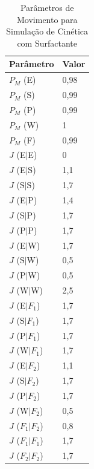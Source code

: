 \documentclass[12pt,oneside]{report}
\begin{document}
\begin{table}[H]
    \centering
    \caption{Parâmetros de Movimento para Simulação de Cinética com Surfactante}
    \vspace{0.2cm}
    \begin{tabularx}{\textwidth}{X m{5cm}}
        \hline
        \textbf{Parâmetro} & \textbf{Valor} \\
        \hline
        $P_M$ (E)                & 0{,}98        \\
        $P_M$ (S)                & 0{,}99        \\
        $P_M$ (P)                & 0{,}99        \\
        $P_M$ (W)                & 1             \\
        $P_M$ (F)                & 0{,}99        \\
        $J$ (E$|$E)              & 0             \\
        $J$ (E$|$S)              & 1{,}1         \\
        $J$ (S$|$S)              & 1{,}7         \\
        $J$ (E$|$P)              & 1{,}4         \\
        $J$ (S$|$P)              & 1{,}7         \\
        $J$ (P$|$P)              & 1{,}7         \\
        $J$ (E$|$W)              & 1{,}7         \\
        $J$ (S$|$W)              & 0{,}5         \\
        $J$ (P$|$W)              & 0{,}5         \\
        $J$ (W$|$W)              & 2{,}5         \\
        $J$ (E$|F_1$)            & 1{,}7         \\
        $J$ (S$|F_1$)            & 1{,}7         \\
        $J$ (P$|F_1$)            & 1{,}7         \\
        $J$ (W$|F_1$)            & 1{,}7         \\
        $J$ (E$|F_2$)            & 1{,}1         \\
        $J$ (S$|F_2$)            & 1{,}7         \\
        $J$ (P$|F_2$)            & 1{,}7         \\
        $J$ (W$|F_2$)            & 0{,}5         \\
        $J$ ($F_1|F_2$)          & 0{,}8         \\
        $J$ ($F_1|F_1$)          & 1{,}7         \\
        $J$ ($F_2|F_2$)          & 1{,}7         \\
        \hline
    \end{tabularx}
    \vspace{0.2cm}
    \label{tab:params_movimento_surfactante}
\end{table}
\end{document}

